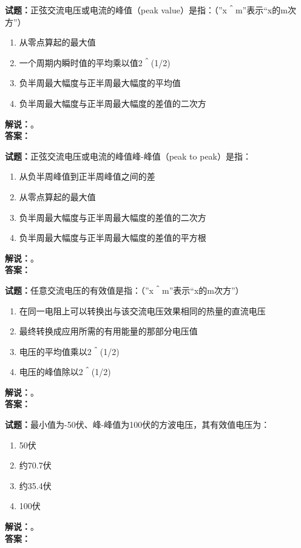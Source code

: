 \documentclass{ctexbook}
\begin{document}
\vspace{\baselineskip}

\noindent\textbf{试题：}正弦交流电压或电流的峰值（peak value）是指：（”x＾m”表示“x的m次方”）
\begin{enumerate}[leftmargin=3em]
  \item 从零点算起的最大值
  \item 一个周期内瞬时值的平均乘以值2＾(1/2)
  \item 负半周最大幅度与正半周最大幅度的平均值
  \item 负半周最大幅度与正半周最大幅度的差值的二次方
\end{enumerate}
\noindent\textbf{解说：}\textbf{}。\\\noindent\textbf{答案：}

\vspace{\baselineskip}

\noindent\textbf{试题：}正弦交流电压或电流的峰值峰-峰值（peak to peak）是指：
\begin{enumerate}[leftmargin=3em]
  \item 从负半周峰值到正半周峰值之间的差
  \item 从零点算起的最大值
  \item 负半周最大幅度与正半周最大幅度的差值的二次方
  \item 负半周最大幅度与正半周最大幅度的差值的平方根
\end{enumerate}
\noindent\textbf{解说：}\textbf{}。\\\noindent\textbf{答案：}

\vspace{\baselineskip}

\noindent\textbf{试题：}任意交流电压的有效值是指：（”x＾m”表示“x的m次方”）
\begin{enumerate}[leftmargin=3em]
  \item 在同一电阻上可以转换出与该交流电压效果相同的热量的直流电压
  \item 最终转换成应用所需的有用能量的那部分电压值
  \item 电压的平均值乘以2＾(1/2)
  \item 电压的峰值除以2＾(1/2)
\end{enumerate}
\noindent\textbf{解说：}\textbf{}。\\\noindent\textbf{答案：}

\vspace{\baselineskip}

\noindent\textbf{试题：}最小值为-50伏、峰-峰值为100伏的方波电压，其有效值电压为：
\begin{enumerate}[leftmargin=3em]
  \item 50伏
  \item 约70.7伏
  \item 约35.4伏
  \item 100伏
\end{enumerate}
\noindent\textbf{解说：}\textbf{}。\\\noindent\textbf{答案：}
\end{document}
